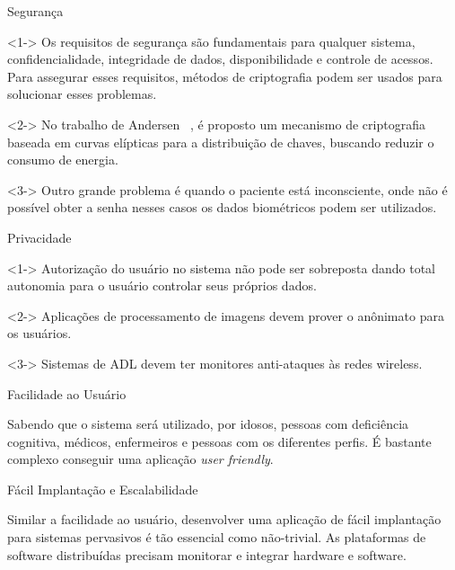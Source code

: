 \documentclass{beamer}
\begin{document}
\begin{frame}{Segurança}
  \begin{block}{}<1->
  Os requisitos de segurança são fundamentais para qualquer sistema, confidencialidade, integridade de dados, disponibilidade e controle de acessos. Para assegurar esses requisitos, métodos de criptografia podem ser usados para solucionar esses problemas.
  \end{block}
  
  \begin{block}{}<2->
   No trabalho de Andersen ~\cite{and09}, é proposto um mecanismo de criptografia baseada em curvas elípticas para a distribuição de chaves, buscando reduzir o consumo de energia.
  \end{block}

  \begin{block}{}<3->
  Outro grande problema é quando o paciente está inconsciente, onde não é possível obter a senha nesses casos os dados biométricos podem ser utilizados.
  \end{block}
\end{frame}


\begin{frame}{Privacidade}
  \begin{block}{}<1->
    Autorização do usuário no sistema não pode ser sobreposta dando total autonomia para o usuário controlar seus próprios dados.
  \end{block}
  
  \begin{block}{}<2->
   Aplicações de processamento de imagens devem prover o anônimato para os usuários.
  \end{block}

  \begin{block}{}<3->
  Sistemas de ADL devem ter monitores anti-ataques às redes wireless.
  \end{block}
\end{frame}

\begin{frame}{Facilidade ao Usuário}
 \begin{block}{}
  Sabendo que o sistema será utilizado, por idosos, pessoas com deficiência cognitiva, médicos, enfermeiros e pessoas com os diferentes perfis. É bastante complexo conseguir uma aplicação \textit{user friendly}.
 \end{block}
\end{frame}

\begin{frame}{Fácil Implantação e Escalabilidade}
  \begin{block}{}
  Similar a facilidade ao usuário, desenvolver uma aplicação de fácil implantação para sistemas pervasivos é tão essencial como não-trivial. As plataformas de software distribuídas precisam monitorar e integrar hardware e software.
  \end{block}
\end{frame}
\end{document}
